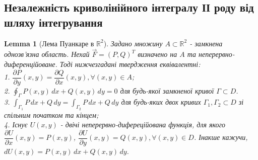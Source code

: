 \documentclass[a4paper, 10pt]{article}
\def\departial#1#2{\dfrac{\partial {#1}}{\partial {#2}}}
\theoremstyle{theoremdd}
\theoremstyle{theoremdd}
\theoremstyle{theoremdd}
\theoremstyle{theoremdd}
\theoremstyle{theoremdd}
\theoremstyle{theoremdd}
\theoremstyle{theoremdd}
\theoremstyle{theoremdd}
\theoremstyle{theoremdd}
\theoremstyle{theoremdd}
\theoremstyle{theoremdd}
\theoremstyle{theoremdd}
\theoremstyle{theoremdd}
\newtheorem{lemma}[theorem]{Lemma}
\theoremstyle{theoremdd}
\theoremstyle{theoremdd}
\begin{document}
\subsection{Незалежність криволінійного інтегралу ІІ роду від шляху інтегрування}
\begin{lemma}[Лема Пуанкаре в $\mathbb{R}^2$]
Задано множину $A \subset \mathbb{R}^2$ - замкнена однозв'язна область. Нехай $\vec{F} = (P,Q)^T$ визначено на $A$ та неперервно-диференційоване. Тоді нижчезгадані твердження еквівалентні:\\
1. $\departial{P}{y}(x,y) = \departial{Q}{x}(x,y), \forall (x,y) \in A$;\\
2. $\displaystyle\oint_{\Gamma} P(x,y)\,dx + Q(x,y)\,dy = 0$ для будь-якої замкненої кривої $\Gamma \subset D$.\\
3. $\displaystyle\int_{\Gamma_1} P\,dx + Q\,dy = \int_{\Gamma_2} P\,dx + Q\,dy$ для будь-яких двох кривих $\Gamma_1, \Gamma_2 \subset D$ зі спільним початком та кінцем;\\
4. Існує $U(x,y)$ - двічі неперервно-дифереційована функція, для якого $\departial{U}{x}(x,y) = P(x,y)$, $\departial{U}{y}(x,y) = Q(x,y), \forall (x,y) \in D$. Інакше кажучи, $dU(x,y) =  P(x,y)\,dx + Q(x,y)\,dy$.
\end{lemma}
\end{document}
